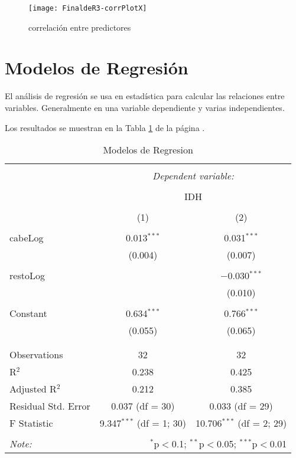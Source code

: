 \documentclass{article}
\begin{document}
\begin{figure}[h]
\centering
\begin{adjustbox}{width=7cm,height=7cm,clip,trim=1.5cm 0.5cm 0cm 1.5cm}

\texttt{[image: FinaldeR3-corrPlotX]}
\end{adjustbox}
\caption{correlaci\'on entre predictores}
\label{corrPlotX}
\end{figure}


\clearpage

\section{Modelos de Regresi\'on}

El an\'alisis de regresi\'on se usa en estad\'istica para calcular las relaciones entre variables. Generalmente en una variable dependiente y varias independientes.

Los resultados se muestran en la Tabla \ref{regresiones} de la p\'agina \pageref{regresiones}.


\begin{table}[!htbp] \centering 
  \caption{Modelos de Regresion} 
  \label{regresiones} 
\begin{tabular}{@{\extracolsep{5pt}}lcc} 
\\[-1.8ex]\hline 
\hline \\[-1.8ex] 
 & \multicolumn{2}{c}{\textit{Dependent variable:}} \\ 
\cline{2-3} 
\\[-1.8ex] & \multicolumn{2}{c}{IDH} \\ 
\\[-1.8ex] & (1) & (2)\\ 
\hline \\[-1.8ex] 
 cabeLog & 0.013$^{***}$ & 0.031$^{***}$ \\ 
  & (0.004) & (0.007) \\ 
  & & \\ 
 restoLog &  & $-$0.030$^{***}$ \\ 
  &  & (0.010) \\ 
  & & \\ 
 Constant & 0.634$^{***}$ & 0.766$^{***}$ \\ 
  & (0.055) & (0.065) \\ 
  & & \\ 
\hline \\[-1.8ex] 
Observations & 32 & 32 \\ 
R$^{2}$ & 0.238 & 0.425 \\ 
Adjusted R$^{2}$ & 0.212 & 0.385 \\ 
Residual Std. Error & 0.037 (df = 30) & 0.033 (df = 29) \\ 
F Statistic & 9.347$^{***}$ (df = 1; 30) & 10.706$^{***}$ (df = 2; 29) \\ 
\hline 
\hline \\[-1.8ex] 
\textit{Note:}  & \multicolumn{2}{r}{$^{*}$p$<$0.1; $^{**}$p$<$0.05; $^{***}$p$<$0.01} \\ 
\end{tabular} 
\end{table} 
\end{document}
